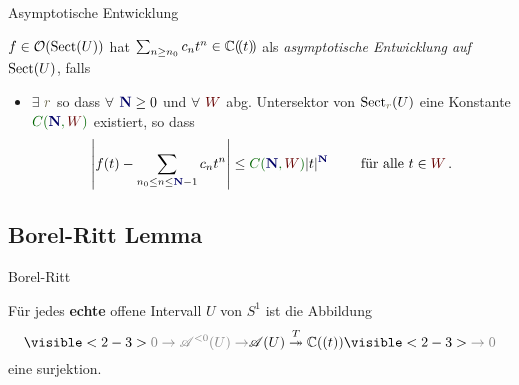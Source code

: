 \begin{frame}[t]{Asymptotische Entwicklung}
  \begin{defn}
    \def\myN{\textbf{\textcolor{blue!40!black}{N}}}
    \def\mySect{\textcolor{red!40!black}{W}}
    \def\myConst{\textcolor{green!40!black}{C(\myN,\mySect)}}
    $f\in\mathcal{O}(\operatorname{Sect}(U))$ hat $\sum_{n\geq n_0}c_nt^n\in\mathbb{C}(\!(t)\!)$ als
    \emph{asymptotische Entwicklung auf $\operatorname{Sect}(U)$}, falls
    \begin{itemize}
      \item $\exists$ $\textcolor{yellow!30!black}{r}$ so dass
        $\forall$ $\myN\geq0$ und
        $\forall$ $\mySect$ abg. Untersektor von
        $\Sect_{\textcolor{yellow!30!black}{r}}(U)$
        eine Konstante $\myConst$ existiert, so dass
        \[
          \left|
            f(t)-\sum_{n_0\leq n\leq\myN-1}c_nt^n
          \right|
          \leq \myConst|t|^{\myN} \qquad \text{ für alle } t\in \mySect \,.
        \]
    \end{itemize}
  \end{defn}
\end{frame}
\subsection{Borel-Ritt Lemma}
\begin{frame}[t,fragile]{Borel-Ritt}
  \begin{llem}
    Für jedes \textbf{echte} offene Intervall $U$ von $S^1$ ist die Abbildung
    \[
      \visible<2-3>{%
        \textcolor{gray}{0\to \sA^{<0}(U) \to}
      }
      \sA(U) \overset{T}\twoheadrightarrow \C((t))
      \visible<2-3>{%
        \textcolor{gray}{\to0}
      }
    \]
    eine surjektion.
  \end{llem}
\end{frame}

